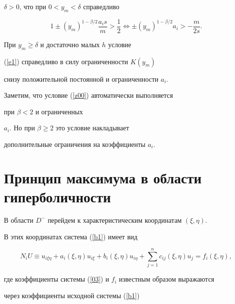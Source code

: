 $\delta >0$, что при $0 < y_m < \delta$ справедливо


$$


1 \pm(y_{m} )^ {1-\beta/2} \frac{a_i s}{m} > \frac{1}{2}


\Leftrightarrow \pm (y_{m} )^ {1-\beta/2} a_i> -\frac{m}{2 s}.


$$





При $y_m \geq \delta$ и достаточно малых $h$ условие


(\ref{e1}) справедливо в силу ограниченности $K(y_m)$


снизу положительной постоянной и ограниченности $a_i$.





Заметим, что условие (\ref{z00}) автоматически выполняется 


при $\beta<2$ и ограниченных


$a_i$. Но при $\beta \geq 2$ это условие накладывает


дополнительные ограничения на коэффициенты $a_i$.








\section{Принцип максимума в области гиперболичности}





В области $D^-$ перейдем к характеристическим координатам $(\xi,\eta)$.


В этих координатах система (\ref{b1}) имеет вид


\begin{equation}\label{03}


N_iU \equiv u_{i\xi\eta} + a_i(\xi,\eta)u_{i\xi} + b_i(\xi,\eta)


u_{i\eta} + \sum_{j=1}^nc_{ij}(\xi,\eta)u_j = f_i(\xi,\eta),


\end{equation}


где коэффициенты системы (\ref{03}) и $f_i$ известным образом выражаются 


через коэффициенты исходной системы (\ref{b1})


